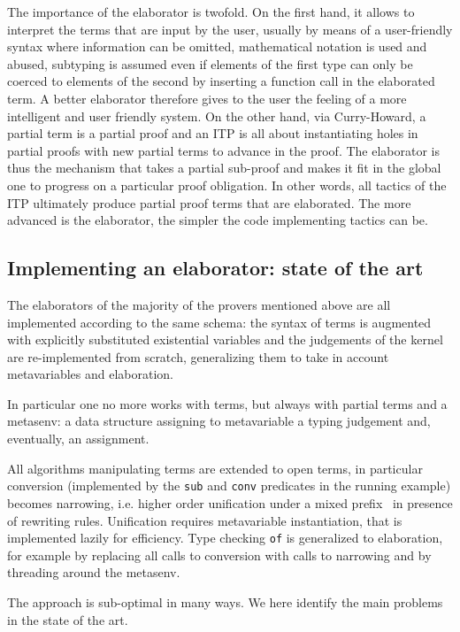 \documentclass{easychair}
\begin{document}
The importance of the elaborator is twofold. On the first hand, it
allows to interpret the terms that are input by the user, usually by
means of a user-friendly syntax where information can be omitted,
mathematical notation is used and abused, subtyping is assumed even if
elements of the first type can only be coerced to elements of the
second by inserting a function call in the elaborated term. A better
elaborator therefore gives to the user the feeling of a more
intelligent and user friendly system. On the other hand, via
Curry-Howard, a partial term is a partial proof and an ITP is all
about instantiating holes in partial proofs with new partial terms to
advance in the proof. The elaborator is thus the mechanism that takes
a partial sub-proof and makes it fit in the global one to progress on
a particular proof obligation. In other words, all tactics of the ITP
ultimately produce partial proof terms that are elaborated. The more
advanced is the elaborator, the simpler the code implementing tactics
can be.

\subsection{Implementing an elaborator: state of the art}  %

The elaborators of the majority of the provers mentioned above are all
implemented according to the same schema: the syntax of terms is augmented with
explicitly substituted existential variables
and the judgements of the kernel are re-implemented from scratch, generalizing
them to take in account metavariables and elaboration.

In particular one no more works with terms, but always with partial terms and
a metasenv: a data structure assigning to metavariable a typing judgement
and, eventually, an assignment.

All algorithms manipulating terms are extended to open
terms, in particular conversion (implemented by the 
\verb+sub+  and \verb+conv+ predicates in the running example)
becomes narrowing, i.e. higher order unification under a
mixed prefix~\cite{mixedprefix} in presence of rewriting rules.
Unification requires metavariable instantiation, that is
implemented lazily for efficiency.  Type checking \verb+of+ is generalized to
elaboration, for example by replacing all calls to conversion with calls to
narrowing and by threading around the metasenv.

The approach is sub-optimal in many ways.  We here identify the main problems
in the state of the art.
\end{document}
